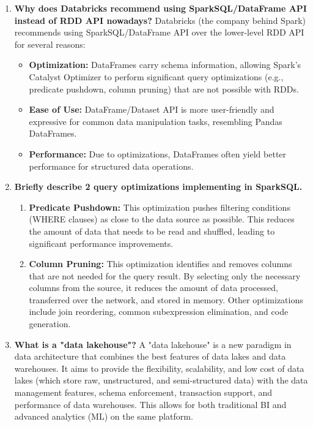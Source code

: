 \documentclass{article}
\begin{document}
\begin{enumerate}
\begin{enumerate}[label=\alph*)]
    \end{enumerate}

    \item \textbf{Why does Databricks recommend using SparkSQL/DataFrame API instead of RDD API nowadays?}
    Databricks (the company behind Spark) recommends using SparkSQL/DataFrame API over the lower-level RDD API for several reasons:
    \begin{itemize}
        \item \textbf{Optimization:} DataFrames carry schema information, allowing Spark's Catalyst Optimizer to perform significant query optimizations (e.g., predicate pushdown, column pruning) that are not possible with RDDs.
        \item \textbf{Ease of Use:} DataFrame/Dataset API is more user-friendly and expressive for common data manipulation tasks, resembling Pandas DataFrames.
        \item \textbf{Performance:} Due to optimizations, DataFrames often yield better performance for structured data operations.
    \end{itemize}

    \item \textbf{Briefly describe 2 query optimizations implementing in SparkSQL.}
    \begin{enumerate}[label=\alph*)]
        \item \textbf{Predicate Pushdown:} This optimization pushes filtering conditions (WHERE clauses) as close to the data source as possible. This reduces the amount of data that needs to be read and shuffled, leading to significant performance improvements.
        \item \textbf{Column Pruning:} This optimization identifies and removes columns that are not needed for the query result. By selecting only the necessary columns from the source, it reduces the amount of data processed, transferred over the network, and stored in memory.
        Other optimizations include join reordering, common subexpression elimination, and code generation.
    \end{enumerate}

    \item \textbf{What is a "data lakehouse"?}
    A "data lakehouse" is a new paradigm in data architecture that combines the best features of data lakes and data warehouses. It aims to provide the flexibility, scalability, and low cost of data lakes (which store raw, unstructured, and semi-structured data) with the data management features, schema enforcement, transaction support, and performance of data warehouses. This allows for both traditional BI and advanced analytics (ML) on the same platform.


\end{enumerate}
\end{document}
